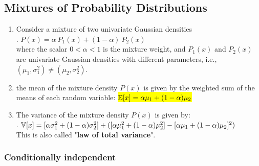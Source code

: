 \subsection{Mixtures of Probability Distributions}


\begin{enumerate}
    \item Consider a mixture of two univariate Gaussian densities
    \hfill \cite{mfml/book/mml/Deisenroth-Faisal-Ong}
    \\[0.2cm]
    .\hfill
    $ P(x) = \alpha\ P_1(x) + (1 - \alpha)\ P_2(x) $
    \hfill \cite{mfml/book/mml/Deisenroth-Faisal-Ong}
    \\[0.2cm]
    where the scalar $0 < \alpha < 1$ is the mixture weight, and $P_1(x)$ and $P_2(x)$ are univariate Gaussian densities with different parameters, i.e., $(\mu_1, \sigma^2_1 ) \neq (\mu_2, \sigma^2_ 2 )$.
    \hfill \cite{mfml/book/mml/Deisenroth-Faisal-Ong}

    \item the mean of the mixture density $P(x)$ is given by the weighted sum of the means of each random variable:
    \colorbox{yellow}{$
        \mathbb{E}[x] = \alpha \mu _1 + (1 - \alpha )\mu _2
    $}
    \hfill \cite{mfml/book/mml/Deisenroth-Faisal-Ong}

    \item The variance of the mixture density $P(x)$ is given by:
    \hfill \cite{mfml/book/mml/Deisenroth-Faisal-Ong}
    \\[0.2cm]
    .\hfill
    $
        \mathbb{V}[x] 
        = [\alpha \sigma ^2_ 1 + (1 - \alpha )\sigma ^2_2] +
        ([\alpha \mu ^2 _1 + (1 - \alpha )\mu ^2 _2]  - [\alpha \mu _1 + (1 - \alpha )\mu _2]^2)
    $
    \hfill \cite{mfml/book/mml/Deisenroth-Faisal-Ong}
    \\[0.2cm]
    This is also called "\textbf{law of total variance}".
    \hfill \cite{mfml/book/mml/Deisenroth-Faisal-Ong}

\end{enumerate}


\subsubsection{Conditionally independent}

